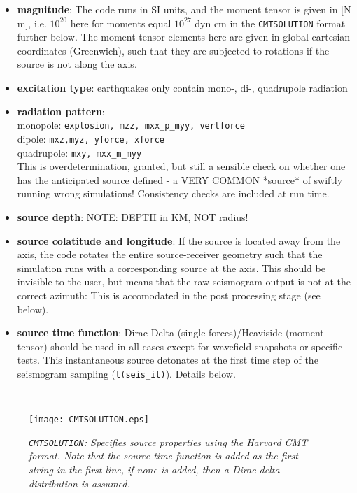 \documentclass[11pt,letter,fleqn,english,notitlepage]{article}
\begin{document}
\begin{itemize}
\item  \textbf{magnitude}: The code runs in SI units, and the moment tensor is given 
in [N m], i.e. $10^{20}$ here for moments equal $10^{27}$ dyn cm in the {\tt CMTSOLUTION}
format further below. The moment-tensor elements here are given in global cartesian coordinates (Greenwich),
such that they are subjected to rotations if the source is not along the axis.
\item \textbf{excitation type}: earthquakes only contain mono-, di-, quadrupole radiation
\item \textbf{radiation pattern}: \\
monopole: {\tt explosion, mzz, mxx\_p\_myy, vertforce}\\
dipole: {\tt mxz,myz, yforce, xforce} \\
quadrupole: {\tt mxy, mxx\_m\_myy}\\
This is overdetermination, granted, but still a sensible check on whether 
one has the anticipated source defined - a VERY COMMON *source* of swiftly 
running wrong simulations! Consistency checks are included at run time.
\item \textbf{source depth}: NOTE: DEPTH in KM, NOT radius!
\item \textbf{source colatitude and longitude}: If the source is located away from the axis, 
the code rotates the entire source-receiver geometry such that the simulation runs with 
a corresponding source at the axis. This should be invisible to the user, but means that 
the raw seismogram output is not at the correct azimuth: This is accomodated in the post 
processing stage (see below). 
\item  \textbf{source time function}: Dirac Delta (single forces)/Heaviside (moment tensor)
should be used in all cases except for wavefield snapshots or specific tests. 
This instantaneous source detonates at the first time step of the seismogram 
sampling ({\tt t(seis\_it)}). Details below.
\end{itemize}

\\
\begin{figure*}[htb]
\begin{center}
\texttt{[image: CMTSOLUTION.eps]}
\caption{\textit{{\tt CMTSOLUTION}: Specifies source properties using the Harvard CMT format. Note that the source-time function
is added as the first string in the first line, if none is added, then a Dirac delta distribution is assumed.}}
\end{center}
\end{figure*}
\end{document}
